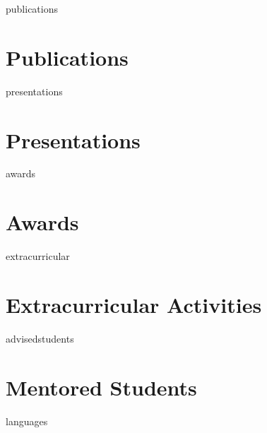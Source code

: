 \documentclass[12pt]{report} %
\begin{document}
\ifcsname publications\endcsname%
\section{Publications}
\publications{}
\fi



\ifcsname presentations\endcsname%
\section{Presentations}
\presentations{}
\fi



\ifcsname awards\endcsname%
\section{Awards}
\awards{}
\fi



\ifcsname extracurricular\endcsname%
\section{Extracurricular Activities}
\extracurricular{}
\fi



\ifcsname advisedstudents\endcsname%
\section{Mentored Students}
\advisedstudents{}
\fi



\ifcsname languages\endcsname%
\end{document}
